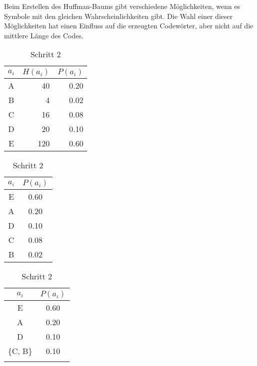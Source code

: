 \documentclass[twoside,11pt,a4paper]{article}
\theoremstyle{break}
\begin{document}
Beim Erstellen des Huffman-Baums gibt verschiedene Möglichkeiten, wenn
es Symbole mit den gleichen Wahrscheinlichkeiten gibt. Die Wahl einer
dieser Möglichkeiten hat einen Einfluss auf die erzeugten Codewörter,
aber nicht auf die mittlere Länge des Codes.

\begin{table}[h]
\centering
\caption{Beispiel für eine Häufigkeitsverteilung}

\begin{subtable}[t]{0.3\textwidth}
  \centering
  \caption{Ausgangstabelle}
  \begin{tabular}{c|r|r}
    $a_i$ & $H(a_i)$ & $P(a_i)$ \\ \hline
    A & 40   & 0.20 \\
    B & 4    & 0.02 \\
    C & 16   & 0.08 \\
    D & 20   & 0.10 \\
    E & 120  & 0.60 \\
  \end{tabular}
  \vspace{3ex}
  \label{tab:HBEX0}
\end{subtable}
\begin{subtable}[t]{0.3\textwidth}
  \centering
  \caption{Schritt 1}
  \begin{tabular}{c|c}
    $a_i$ & $P(a_i)$ \\ \hline
    E & 0.60 \\
    A & 0.20 \\
    D & 0.10 \\
    C & 0.08 \\
    B & 0.02 \\
  \end{tabular}
  \vspace{3ex}
  \label{tab:HBEX1}
\end{subtable}
\begin{subtable}[t]{0.3\textwidth}
  \centering
  \caption{Schritt 2}
  \begin{tabular}{c|c}
    $a_i$ & $P(a_i)$ \\ \hline
    E & 0.60 \\
    A & 0.20 \\
    D & 0.10 \\
    \{C, B\} & 0.10 \\ \\
  \end{tabular}
  \vspace{3ex}
  \label{tab:HBEX2}
\end{subtable}

\end{table}
\end{document}
